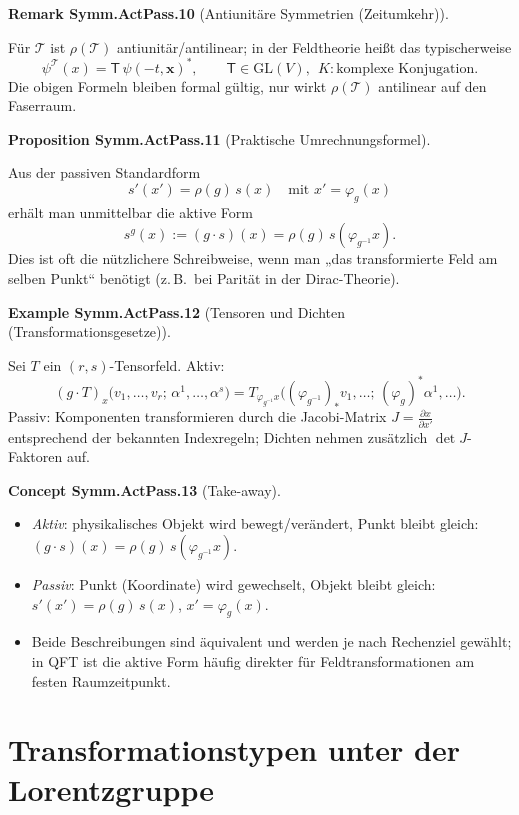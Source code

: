 \documentclass[10pt, letterpaper]{article}
\newcommand{\CustomHeading}[3]{%
  \par\medskip\noindent%
  \textbf{#1 #2} \textnormal{(#3)}.\enskip%
}
\newenvironment{PROP}[2]{\begin{unitbox}\CustomHeading{Proposition}{#1}{#2}}{\end{unitbox}}
\newenvironment{REM}[2]{\begin{unitbox}\CustomHeading{Remark}{#1}{#2}}{\end{unitbox}}
\newenvironment{EXA}[2]{\begin{unitbox}\CustomHeading{Example}{#1}{#2}}{\end{unitbox}}
\newenvironment{CONC}[2]{\begin{unitbox}\CustomHeading{Concept}{#1}{#2}}{\end{unitbox}}
\begin{document}
\begin{REM}{Symm.ActPass.10}{Antiunitäre Symmetrien (Zeitumkehr)}
Für $\mathcal T$ ist $\rho(\mathcal T)$ antiunitär/antilinear; in der Feldtheorie heißt das typischerweise
\[
\psi^{\mathcal T}(x)=\mathsf T\,\psi(-t,\mathbf x)^*,\qquad \mathsf T\in \mathrm{GL}(V),\ \ K:\text{komplexe Konjugation}.
\]
Die obigen Formeln bleiben formal gültig, nur wirkt $\rho(\mathcal T)$ antilinear auf den Faserraum.
\end{REM}

\begin{PROP}{Symm.ActPass.11}{Praktische Umrechnungsformel}
Aus der passiven Standardform
\[
s'(x')=\rho(g)\,s(x)\quad\text{mit }x'=\varphi_g(x)
\]
erhält man unmittelbar die aktive Form
\[
s^g(x):=(g\cdot s)(x)=\rho(g)\,s(\varphi_{g^{-1}}x).
\]
Dies ist oft die nützlichere Schreibweise, wenn man „das transformierte Feld am selben Punkt“ benötigt (z.\,B.\ bei Parität in der Dirac-Theorie).
\end{PROP}

\begin{EXA}{Symm.ActPass.12}{Tensoren und Dichten (Transformationsgesetze)}
Sei $T$ ein $(r,s)$-Tensorfeld. Aktiv:
\[
(g\cdot T)_x\bigl(v_1,\dots,v_r;\,\alpha^1,\dots,\alpha^s\bigr)
=
T_{\varphi_{g^{-1}}x}\bigl((\varphi_{g^{-1}})_*v_1,\dots;\,(\varphi_g)^*\alpha^1,\dots\bigr).
\]
Passiv: Komponenten transformieren durch die Jacobi-Matrix $J=\frac{\partial x}{\partial x'}$ entsprechend der bekannten Indexregeln; Dichten nehmen zusätzlich $\det J$-Faktoren auf.
\end{EXA}

\begin{CONC}{Symm.ActPass.13}{Take-away}
\begin{itemize}
  \item \emph{Aktiv}: physikalisches Objekt wird bewegt/verändert, Punkt bleibt gleich: $(g\cdot s)(x)=\rho(g)\,s(\varphi_{g^{-1}}x)$.
  \item \emph{Passiv}: Punkt (Koordinate) wird gewechselt, Objekt bleibt gleich: $s'(x')=\rho(g)\,s(x)$, $x'=\varphi_g(x)$.
  \item Beide Beschreibungen sind äquivalent und werden je nach Rechenziel gewählt; in QFT ist die aktive Form häufig direkter für Feldtransformationen am festen Raumzeitpunkt.
\end{itemize}
\end{CONC}


\pagebreak

\section{Transformationstypen unter der Lorentzgruppe}
\end{document}
